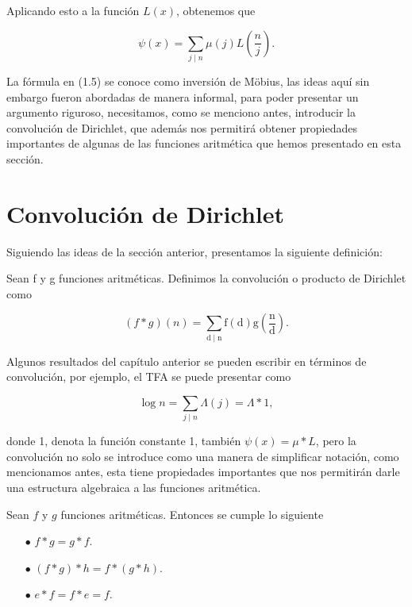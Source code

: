 Aplicando esto a la función $L(x)$, obtenemos que

$$\psi(x)=\sum_{j\mid n} \mu(j)L \left( \frac{n}{j} \right).$$

La fórmula en (1.5) se conoce como inversión de Möbius, las ideas aquí sin embargo fueron abordadas de manera informal, para poder presentar un argumento riguroso, necesitamos, como se menciono antes, introducir la convolución de Dirichlet, que además nos permitirá obtener propiedades importantes de algunas de las funciones aritmética que hemos presentado en esta sección.

\section{Convolución de Dirichlet}

Siguiendo las ideas de la  sección anterior, presentamos la siguiente definición:
\pagebreak

\begin{definition}
Sean f y g funciones aritméticas. Definimos la convolución o producto de Dirichlet como

$$(f*g)(n)=\sum_{\mathrm{d} \mid \mathrm{n}} \mathrm{f}(\mathrm{d}) \mathrm{g}\left(\frac{\mathrm{n}}{\mathrm{d}}\right).$$

\end{definition}

Algunos resultados del capítulo anterior se pueden escribir en términos de convolución, por ejemplo, el TFA se puede presentar como

$$\log n=\sum_{j\mid n}\Lambda(j)=\Lambda * 1,$$

donde 1, denota la función constante 1, también $\psi(x)=\mu*L$, pero la convolución no solo se introduce como una manera de simplificar notación, como mencionamos antes, esta tiene propiedades importantes que nos permitirán darle una estructura algebraica a las funciones aritmética.

\begin{theorem}
Sean $f$ y $g$ funciones aritméticas. Entonces se cumple lo siguiente

\begin{itemize}

\item[$\bullet$] $f * g=g * f$.

\item[$\bullet$] $(f * g) * h=f *(g * h)$.

\item[$\bullet$] $e * f=f * e=f$.

\end{itemize}

\end{theorem}


